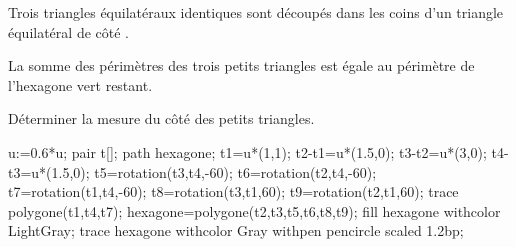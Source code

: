 \begin{exercice*}
    Trois triangles équilatéraux identiques sont découpés dans les coins d’un triangle équilatéral de côté .
    
    La somme des périmètres des trois petits triangles est égale au périmètre de l’hexagone vert restant.
    
    Déterminer la mesure du côté des petits triangles.

    \vspace*{-5mm}
    \begin{center}
        \begin{Geometrie}
            u:=0.6*u;
            pair t[];
            path hexagone;
            t1=u*(1,1);
            t2-t1=u*(1.5,0);
            t3-t2=u*(3,0);
            t4-t3=u*(1.5,0);
            t5=rotation(t3,t4,-60);
            t6=rotation(t2,t4,-60);
            t7=rotation(t1,t4,-60);
            t8=rotation(t3,t1,60);
            t9=rotation(t2,t1,60);
            trace polygone(t1,t4,t7);
            hexagone=polygone(t2,t3,t5,t6,t8,t9);
            fill hexagone withcolor LightGray;
            trace hexagone withcolor Gray withpen pencircle scaled 1.2bp;
        \end{Geometrie}
    \end{center}
    \vspace*{-7mm}
\end{exercice*}

